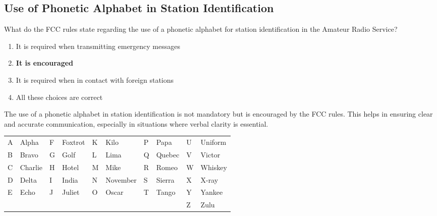 \subsection{Use of Phonetic Alphabet in Station Identification}
\label{T1A03}

\begin{tcolorbox}[colback=gray!10!white,colframe=black!75!black,title=T1A03]
What do the FCC rules state regarding the use of a phonetic alphabet for station identification in the Amateur Radio Service?
\begin{enumerate}[label=\Alph*),noitemsep]
    \item It is required when transmitting emergency messages
    \item \textbf{It is encouraged}
    \item It is required when in contact with foreign stations
    \item All these choices are correct
\end{enumerate}
\end{tcolorbox}

The use of a phonetic alphabet in station identification is not mandatory but is encouraged by the FCC rules. This helps in ensuring clear and accurate communication, especially in situations where verbal clarity is essential.


\begin{center}
    \begin{tcolorbox}[title=NATO Phonetic Alphabet,colback=white]
    \begin{tabular}{|l|l|l|l|l|l|l|l|l|l|}
    \hline
    A & Alpha & F & Foxtrot & K & Kilo & P & Papa & U & Uniform \\
    B & Bravo & G & Golf & L & Lima & Q & Quebec & V & Victor \\
    C & Charlie & H & Hotel & M & Mike & R & Romeo & W & Whiskey \\ 
    D & Delta & I & India & N & November & S & Sierra & X & X-ray \\
    E & Echo & J & Juliet & O & Oscar & T & Tango & Y & Yankee \\
                                             &        &  &        &  &        &  &        & Z & Zulu \\
    \hline
    \end{tabular}
    \end{tcolorbox}
    \end{center}